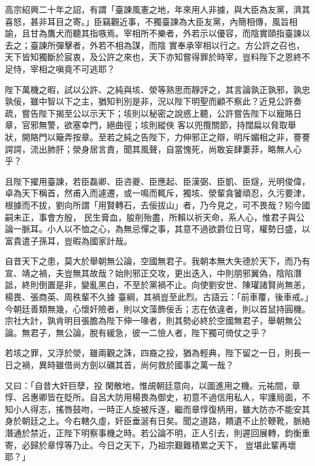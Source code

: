 \begin{pinyinscope}
 高宗紹興二十年之詔，有謂「臺諫風憲之地，年來用人非據，與大臣為友黨，濟其喜怒，甚非耳目之寄。」臣竊觀近事，不獨臺諫為大臣友黨，內簡相傳，風旨相諭，且甘為鷹犬而聽其指嗾焉。宰相所不樂者，外若示以優容，而陰實頤指臺諫以去之；臺諫所彈擊者，外若不相為謀，而陰
 實奉承宰相以行之。方公許之召也，天下皆知獨斷於宸衷，及公許之來也，天下亦知嘗得罪於時宰，豈料陛下之恩終不足恃，宰相之嗔竟不可逃耶？



 陛下萬機之暇，試以公許、之純與垓、滎等熟思而靜評之，其言論孰正孰邪，孰忠孰佞，雖中智以下之主，猶知判別是非，況以陛下明聖而顧不察此？近見公許奏疏，嘗告陛下揭至公以示天下；垓則以秘密之說惑上聽，公許嘗告陛下以寵賂日章，官邪無警，欲塞幸門，絕曲徑；垓則縱俠
 客以兜攬關節，持闊扁以脅取舉狀，開賂門以簸弄按章。至若之純之告陛下，力伸邪正之辯，明斥媚相之非，謇謇諤諤，流出肺肝；滎身居言責，聞其風聲，自當愧死，尚敢妄肆萋菲，略無人心乎？



 且陛下擢用臺諫，若臣磊卿、臣咨夔、臣應起、臣漢弼、臣凱、臣燧，光明俊偉，卓為天下稱首，然甫入而遽遷，或一鳴而輒斥，獨垓、滎輩貪饕頑忍，久污要津，根據而不拔，劉向所謂「用賢轉石，去佞拔山」者，乃今見之，可不畏哉？矧今國嗣未正，事會方殷，
 民生膏血，朘削殆盡，所賴以祈天命，系人心，惟君子與公論一脈耳。小人以不恤之心，為無忌憚之事，其意不過欲爵位日穹，權勢日盛，以富貴遣子孫耳，豈暇為國家計哉。



 自昔天下之患，莫大於舉朝無公論，空國無君子。我朝本無大失德於天下，而乃有宣、靖之禍，夫豈無其故哉？始則邪正交攻，更出迭入，中則朋邪翼偽，陰陷潛詆，終則倒置是非，變亂黑白，不至於黨禍不止。向使劉安世、陳瓘諸賢尚無恙，楊畏、張商英、周秩輩不久據
 臺綱，其禍豈至此烈。古語云：「前車覆，後車戒。」今朝廷善類無幾，心懷奸險者，則以文藻飾佞舌；志在依違者，則以首鼠持圓機。宗社大計，孰肯明目張膽為陛下伸一喙者，則其勢必終於空國無君子，舉朝無公論。無君子，無公論，脫有緩急，彼一二憸人者，陛下獨可倚仗之乎？



 若垓之罪，又浮於滎，雖兩觀之誅，四裔之投，猶為輕典，陛下留之一日，則長一日之禍，異時雖借尚方劍以礪其首，尚何救於國事之萬一哉？



 又曰：「自昔大奸巨孽，投
 閑散地，惟覘朝廷意向，以圖進用之機。元祐間，章惇、呂惠卿皆在貶所。自呂大防用楊畏為御史，初意不過信用私人，牢護局面，不知小人得志，搖唇鼓吻，一時正人旋被斥逐，繼而章惇復柄用，雖大防亦不能安其身於朝廷之上。今右轄久虛，奸臣垂涎有日矣。聞之道路，饋遺不止於鞭靴，脈絡潛通於禁近，正陛下明察事機之時。若公論不明，正人引去，則遲回展轉，鈞衡重寄，必歸於章惇等乃止。今日之天下，乃祖宗艱難積累之天下，
 豈堪此輩再壞耶？」




\end{pinyinscope}
